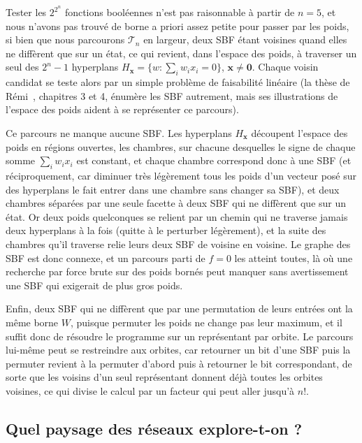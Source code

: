 \documentclass[12pt, a4paper]{article}
\begin{document}
Tester les $2^{2^n}$ fonctions booléennes n'est pas raisonnable à partir de $n = 5$, et nous n'avons pas trouvé de borne a priori assez petite pour passer par les poids, si bien que nous parcourons $\mathcal{T}_n$ en largeur, deux SBF étant voisines quand elles ne diffèrent que sur un état, ce qui revient, dans l'espace des poids, à traverser un seul des $2^n - 1$ hyperplans $H_{\mathbf{x}} = \{ w : \sum_i w_i x_i = 0 \}$, $\mathbf{x} \neq \mathbf{0}$.
Chaque voisin candidat se teste alors par un simple problème de faisabilité linéaire (la thèse de Rémi~\cite{segretain2023}, chapitres 3 et 4, énumère les SBF autrement, mais ses illustrations de l'espace des poids aident à se représenter ce parcours).

Ce parcours ne manque aucune SBF.
Les hyperplans $H_{\mathbf{x}}$ découpent l'espace des poids en régions ouvertes, les chambres, sur chacune desquelles le signe de chaque somme $\sum_i w_i x_i$ est constant, et chaque chambre correspond donc à une SBF (et réciproquement, car diminuer très légèrement tous les poids d'un vecteur posé sur des hyperplans le fait entrer dans une chambre sans changer sa SBF), et deux chambres séparées par une seule facette à deux SBF qui ne diffèrent que sur un état.
Or deux poids quelconques se relient par un chemin qui ne traverse jamais deux hyperplans à la fois (quitte à le perturber légèrement), et la suite des chambres qu'il traverse relie leurs deux SBF de voisine en voisine.
Le graphe des SBF est donc connexe, et un parcours parti de $f = 0$ les atteint toutes, là où une recherche par force brute sur des poids bornés peut manquer sans avertissement une SBF qui exigerait de plus gros poids.

Enfin, deux SBF qui ne diffèrent que par une permutation de leurs entrées ont la même borne $W$, puisque permuter les poids ne change pas leur maximum, et il suffit donc de résoudre le programme sur un représentant par orbite.
Le parcours lui-même peut se restreindre aux orbites, car retourner un bit d'une SBF puis la permuter revient à la permuter d'abord puis à retourner le bit correspondant, de sorte que les voisins d'un seul représentant donnent déjà toutes les orbites voisines, ce qui divise le calcul par un facteur qui peut aller jusqu'à $n!$.

\subsection{Quel paysage des réseaux explore-t-on ?}
\label{sec:paysage}
\end{document}
